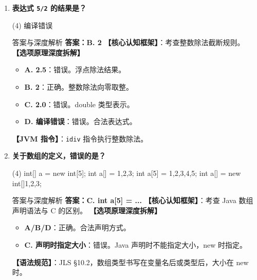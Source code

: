 ﻿\documentclass[12pt, a4paper]{ctexart}
\newcommand{\code}[1]{\texttt{#1}}
\begin{document}
\begin{enumerate}[label=\textbf{\arabic*.}, itemsep=1em]
	\item \textbf{表达式 \code{5/2} 的结果是？}
	      \begin{tasks}(4)
		       \task 2  \task 编译错误
	      \end{tasks}
	      \begin{bluebox}{答案与深度解析}
		      \textbf{答案：B. 2}
		      \textbf{【核心认知框架】}：考查整数除法截断规则。
		      \textbf{【选项原理深度拆解】}
		      \begin{itemize}[leftmargin=*, nosep]
			      \item \textbf{A. 2.5}：错误。浮点除法结果。
			      \item \textbf{B. 2}：正确。整数除法向零取整。
			      \item \textbf{C. 2.0}：错误。double 类型表示。
			      \item \textbf{D. 编译错误}：错误。合法表达式。
		      \end{itemize}
		      \textbf{【JVM 指令】}：\code{idiv} 指令执行整数除法。
	      \end{bluebox}

	\item \textbf{关于数组的定义，错误的是？}
	      \begin{tasks}(4)
		      \task int[] a = new int[5];
		      \task int a[] = {1,2,3};
		      \task int a[5] = {1,2,3,4,5};
		      \task int a[] = new int[]{1,2,3};
	      \end{tasks}
	      \begin{bluebox}{答案与深度解析}
		      \textbf{答案：C. int a[5] = ...}
		      \textbf{【核心认知框架】}：考查 Java 数组声明语法与 C 的区别。
		      \textbf{【选项原理深度拆解】}
		      \begin{itemize}[leftmargin=*, nosep]
			      \item \textbf{A/B/D}：正确。合法声明方式。
			      \item \textbf{C. 声明时指定大小}：错误。Java 声明时不能指定大小，new 时指定。
		      \end{itemize}
		      \textbf{【语法规范】}：JLS §10.2，数组类型书写在变量名后或类型后，大小在 new 时。
	      \end{bluebox}


\end{enumerate}
\end{document}
